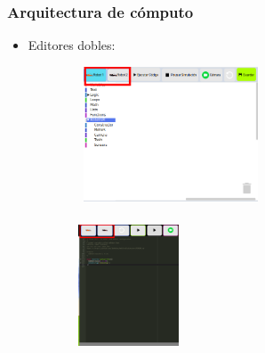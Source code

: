 \documentclass[xcolor={table}]{beamer}
\begin{document}
		\begin{frame}
			\frametitle{Arquitectura de cómputo}
			\begin{itemize}
			     \item Editores dobles:
			\end{itemize}
				\begin{figure}[H]
                \centering
                \begin{subfigure}{\textwidth}
                 \includegraphics[width=5.5cm, height=4cm]{img/competitivoEditorScratch.png}
                 \label{fig:ir}
                \end{subfigure}
                \begin{subfigure}{\textwidth}
                 \includegraphics[width=3cm, height=4cm]{img/competitiveEditorJavascript.png}
                \label{fig:vision}
                \end{subfigure}
                \end{figure}
		\end{frame}
		
\end{document}
